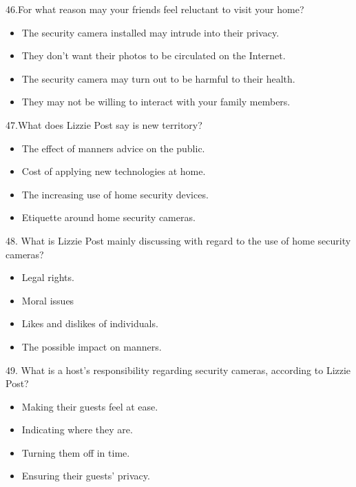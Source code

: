 \documentclass[UTF8,11pt]{ctexart}
\begin{document}
46.For what reason may your friends feel reluctant to visit your home?


\begin{itemize}[leftmargin=2em,itemsep=.2em,topsep=.4em]\item[A.] The security camera installed may intrude into their privacy.
\item[B.] They don’t want their photos to be circulated on the Internet.
\item[C.] The security camera may turn out to be harmful to their health.
\item[D.] They may not be willing to interact with your family members.
\end{itemize}

47.What does Lizzie Post say is new territory?


\begin{itemize}[leftmargin=2em,itemsep=.2em,topsep=.4em]\item[A.] The effect of manners advice on the public.
\item[B.] Cost of applying new technologies at home.
\item[C.] The increasing use of home security devices.
\item[D.] Etiquette around home security cameras.
\end{itemize}

48. What is Lizzie Post mainly discussing with regard to the use of home security cameras?


\begin{itemize}[leftmargin=2em,itemsep=.2em,topsep=.4em]\item[A.] Legal rights.
\item[B.] Moral issues
\item[C.] Likes and dislikes of individuals.
\item[D.] The possible impact on manners.
\end{itemize}

49. What is a host’s responsibility regarding security cameras, according to Lizzie Post?


\begin{itemize}[leftmargin=2em,itemsep=.2em,topsep=.4em]\item[A.] Making their guests feel at ease.
\item[B.] Indicating where they are.
\item[C.] Turning them off in time.
\item[D.] Ensuring their guests’ privacy.
\end{itemize}
\end{document}
